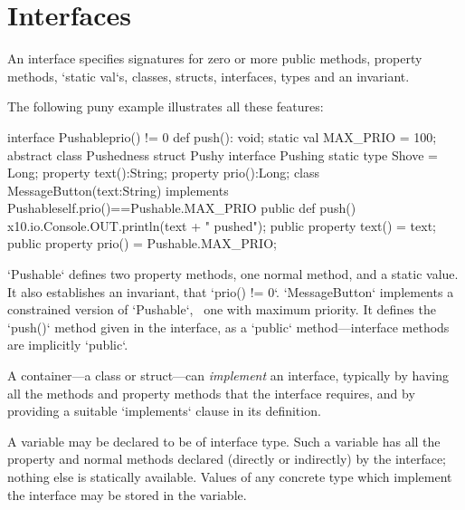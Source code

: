 \chapter{Interfaces}




\label{XtenInterfaces}

An interface specifies signatures for zero or more public methods, property
methods,
\xcd`static val`s, 
classes, structs, interfaces, types
and an invariant. 

The following puny example illustrates all these features: 
% 
\begin{xten}
interface Pushable{prio() != 0} {
  def push(): void;
  static val MAX_PRIO = 100;
  abstract class Pushedness{}
  struct Pushy{}
  interface Pushing{}
  static type Shove = Long;
  property text():String;
  property prio():Long;
}
class MessageButton(text:String)
  implements Pushable{self.prio()==Pushable.MAX_PRIO} {
  public def push() { 
    x10.io.Console.OUT.println(text + " pushed");
  }
  public property text() = text;
  public property prio() = Pushable.MAX_PRIO;
}
\end{xten}
%
\noindent
\xcd`Pushable` defines two property methods, one normal method, and a static
value.  It also 
establishes an invariant, that \xcd`prio() != 0`. 
\xcd`MessageButton` implements a constrained version of \xcd`Pushable`,
\viz\ one with maximum priority.  It
defines the \xcd`push()` method given in the interface, as a \xcd`public`
method---interface methods are implicitly \xcd`public`.


A container---a class or struct---can {\em implement} an interface,
typically by having all the methods and property methods that the interface
requires, and by providing a suitable \xcd`implements` clause in its definition.

A variable may be declared to be of interface type.  Such a variable has all
the property and normal methods declared (directly or indirectly) by the
interface; 
nothing else is statically available.  Values of any concrete type which
implement the interface may be stored in the variable.  

